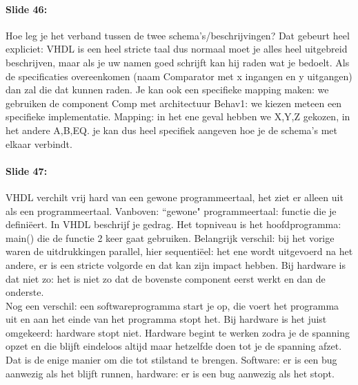 \documentclass[10pt,a4paper]{book}
\begin{document}
\paragraph{Slide 46:} Hoe leg je het verband tussen de twee schema's/beschrijvingen? Dat gebeurt heel expliciet: VHDL is een heel stricte taal dus normaal moet je alles heel uitgebreid beschrijven, maar als je uw namen goed schrijft kan hij raden wat je bedoelt. Als de specificaties overeenkomen (naam Comparator met x ingangen en y uitgangen) dan zal die dat kunnen raden. Je kan ook een specifieke mapping maken: we gebruiken de component Comp met architectuur Behav1: we kiezen meteen een specifieke implementatie. Mapping: in het ene geval hebben we X,Y,Z gekozen, in het andere A,B,EQ. je kan dus heel specifiek aangeven hoe je de schema's met elkaar verbindt.

\paragraph{Slide 47:} VHDL verchilt vrij hard van een gewone programmeertaal, het ziet er alleen uit als een programmeertaal. Vanboven: ``gewone" programmeertaal: functie die je defini\"eert. In VHDL beschrijf je gedrag. Het topniveau is het hoofdprogramma: main() die de functie 2 keer gaat gebruiken. Belangrijk verschil: bij het vorige waren de uitdrukkingen parallel, hier sequenti\"eel: het ene wordt uitgevoerd na het andere, er is een stricte volgorde en dat kan zijn impact hebben. Bij hardware is dat niet zo: het is niet zo dat de bovenste component eerst werkt en dan de onderste. \\
Nog een verschil: een softwareprogramma start je op, die voert het programma uit en aan het einde van het programma stopt het. Bij hardware is het juist omgekeerd: hardware stopt niet. Hardware begint te werken zodra je de spanning opzet en die blijft eindeloos altijd maar hetzelfde doen tot je de spanning afzet. Dat is de enige manier om die tot stilstand te brengen. Software: er is een bug aanwezig als het blijft runnen, hardware: er is een bug aanwezig als het stopt.
\end{document}
